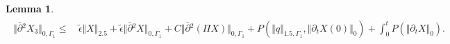 \documentclass[10pt,reqno]{amsart}
\theoremstyle{plain}
\newtheorem{lemma}[theorem]{Lemma}
\theoremstyle{definition}
\numberwithin{equation}{section}
\newcommand{\al}{\alpha}
\newcommand{\Ga}{\Gamma}
\newcommand{\norm}[1]{\Vert#1\Vert}
\begin{document}
{{\begin{lemma}
\begin{align}
\begin{split}
\norm{ \overline{\partial}{}^2 X_3 }_{0,\Ga_1}
\leq 
& 
\, \widetilde{\epsilon} \norm{X}_{2.5} 
+ 
\widetilde{\epsilon}
\norm{ \overline{\partial}{}^2 X }_{0,\Ga_1}
+
C\norm{\overline{\partial}{}^2 (\Pi X) }_{0,\Ga_1}
+ P(\norm{q}_{1.5,\Ga_1}, \norm{ \partial_t X(0)}_{0})  
+  \int_0^t P(\norm{\partial_t X}_0 ).
\end{split}
\label{estimate_projection_N_2_improved}
\end{align}
\end{lemma}






}}
\end{document}

